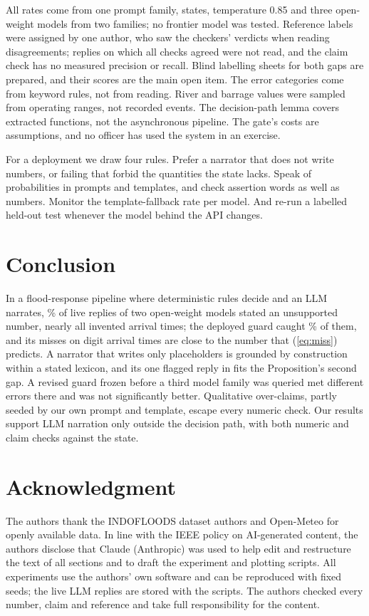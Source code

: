 \documentclass[conference]{IEEEtran}
\begin{document}
All rates come from one prompt family, \LiveStates{} states, temperature 0.85 and three open-weight models from two families; no frontier model was tested. Reference labels were assigned by one author, who saw the checkers' verdicts when reading disagreements; replies on which all checks agreed were not read, and the claim check has no measured precision or recall. Blind labelling sheets for both gaps are prepared, and their scores are the main open item. The error categories come from keyword rules, not from reading. River and barrage values were sampled from operating ranges, not recorded events. The decision-path lemma covers extracted functions, not the asynchronous pipeline. The gate's costs are assumptions, and no officer has used the system in an exercise.

For a deployment we draw four rules. Prefer a narrator that does not write numbers, or failing that forbid the quantities the state lacks. Speak of probabilities in prompts and templates, and check assertion words as well as numbers. Monitor the template-fallback rate per model. And re-run a labelled held-out test whenever the model behind the API changes.

\section{Conclusion}
In a flood-response pipeline where deterministic rules decide and an LLM narrates, \LiveUnsupPct\% of live replies of two open-weight models stated an unsupported number, nearly all invented arrival times; the deployed guard caught \LiveDepRec\% of them, and its misses on digit arrival times are close to the number that (\ref{eq:miss}) predicts. A narrator that writes only placeholders is grounded by construction within a stated lexicon, and its one flagged reply in \SlotsPassed{} fits the Proposition's second gap. A revised guard frozen before a third model family was queried met different errors there and was not significantly better. Qualitative over-claims, partly seeded by our own prompt and template, escape every numeric check. Our results support LLM narration only outside the decision path, with both numeric and claim checks against the state.

\section*{Acknowledgment}
The authors thank the INDOFLOODS dataset authors and Open-Meteo for openly available data.
In line with the IEEE policy on AI-generated content, the authors disclose that Claude (Anthropic) was used to help edit and restructure the text of all sections and to draft the experiment and plotting scripts. All experiments use the authors' own software and can be reproduced with fixed seeds; the live LLM replies are stored with the scripts. The authors checked every number, claim and reference and take full responsibility for the content.
\end{document}
